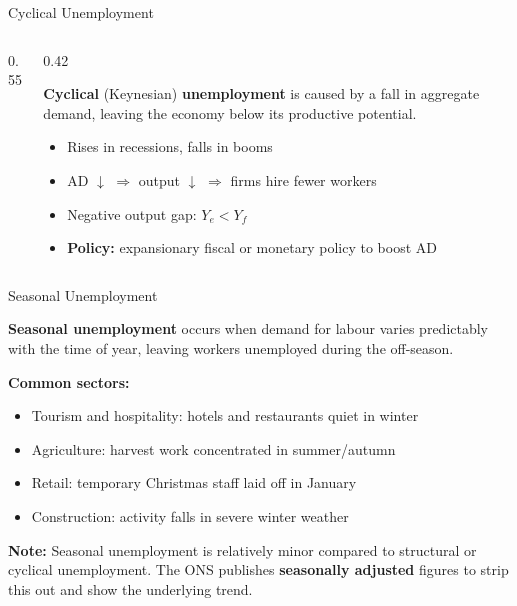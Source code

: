 \documentclass[16pt,aspectratio=169]{beamer}
\begin{document}
\begin{frame}{Cyclical Unemployment}
\begin{columns}
\begin{column}{0.55\textwidth}
\begin{center}
\begin{tikzpicture}
                \end{tikzpicture}
            \end{center}
        \end{column}
        \begin{column}{0.42\textwidth}
            \begin{definition}
                \textbf{Cyclical} (Keynesian) \textbf{unemployment} is caused by a fall in aggregate demand, leaving the economy below its productive potential.
            \end{definition}
            \vspace{0.5em}
            \begin{itemize}\setlength\itemsep{0.35em}
                \item Rises in recessions, falls in booms
                \item AD $\downarrow$ $\Rightarrow$ output $\downarrow$ $\Rightarrow$ firms hire fewer workers
                \item Negative output gap: $Y_e < Y_f$
                \item \textbf{Policy:} expansionary fiscal or monetary policy to boost AD
            \end{itemize}
        \end{column}
    \end{columns}
\end{frame}

\begin{frame}{Seasonal Unemployment}
    \begin{definition}
        \textbf{Seasonal unemployment} occurs when demand for labour varies predictably with the time of year, leaving workers unemployed during the off-season.
    \end{definition}

    \vspace{0.8em}
    \textbf{Common sectors:}
    \begin{itemize}
        \item Tourism and hospitality: hotels and restaurants quiet in winter
        \item Agriculture: harvest work concentrated in summer/autumn
        \item Retail: temporary Christmas staff laid off in January
        \item Construction: activity falls in severe winter weather
    \end{itemize}

    \vspace{0.5em}
    \textbf{Note:} Seasonal unemployment is relatively minor compared to structural or cyclical unemployment. The ONS publishes \textbf{seasonally adjusted} figures to strip this out and show the underlying trend.
\end{frame}
\end{document}
